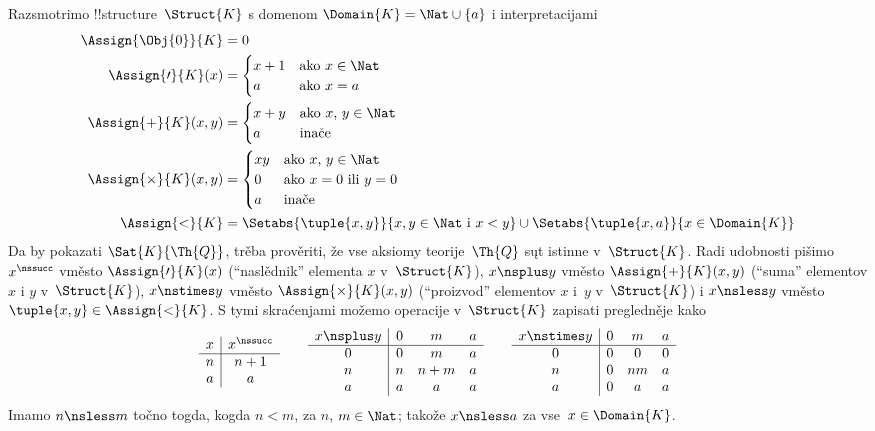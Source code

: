 \documentclass[../../../include/open-logic-section]{subfiles}
\begin{document}
\begin{ex}
Razsmotrimo !!{structure}~$\Struct{K}$ s domenom $\Domain{K} = \Nat
\cup \{a\}$ i interpretacijami
\begin{align*}
  \Assign{\Obj{0}}{K} & = 0\\
  \Assign{\prime}{K}(x) & =
  \begin{cases}
    x+1 & \text{ako $x\in \Nat$}\\
    a & \text{ako $x = a$}
  \end{cases}\\
  \Assign{+}{K}(x, y) & =
  \begin{cases}
    x+y & \text{ako $x$, $y \in\Nat$}\\
    a & \text{inače}
  \end{cases}\\
  \Assign{\times}{K}(x, y) & =
  \begin{cases}
    xy & \text{ako $x$, $y \in\Nat$}\\
    0 & \text{ako $x = 0$ ili $y = 0$}\\
    a & \text{inače}\\
  \end{cases}\\
  \Assign{<}{K} & =
  \Setabs{\tuple{x,y}}{x, y \in \Nat \text{ i } x<y} \cup
  \Setabs{\tuple{x,a}}{x \in \Domain{K}}
\end{align*}
Da by pokazati $\Sat{K}{\Th{Q}}$, trěba prověriti, že vse aksiomy
teorije~$\Th{Q}$ sųt istinne v~$\Struct{K}$. Radi udobnosti pišimo
$x^\nssucc$ vměsto $\Assign{\prime}{K}(x)$ (``naslědnik'' elementa $x$
v~$\Struct{K}$), $x \nsplus y$ vměsto $\Assign{+}{K}(x, y)$ (``suma''
elementov $x$ i $y$ v~$\Struct{K}$), $x \nstimes y$ vměsto
$\Assign{\times}{K}(x, y)$ (``proizvod'' elementov $x$ i~$y$
v~$\Struct{K}$) i $x \nsless y$ vměsto $\tuple{x,y} \in
\Assign{<}{K}$. S tymi skraćenjami možemo operacije
v~$\Struct{K}$ zapisati pregledněje kako
\[
\begin{array}{c|c}
  x & x^\nssucc \\
  \hline
  n & n+1 \\
  a & a
\end{array}
\qquad
\begin{array}{c|ccc}
  x \nsplus y & 0 & m & a \\
  \hline
  0 & 0 & m & a \\
  n & n & n+m & a \\
  a & a & a & a \\
\end{array}
\qquad
\begin{array}{c|ccc}
  x \nstimes y & 0 & m & a \\
  \hline
  0 & 0 & 0 & 0 \\
  n & 0 & nm & a \\
  a & 0 & a & a \\
\end{array}
\]
Imamo $n \nsless m$ točno togda, kogda $n<m$, za $n$, $m \in \Nat$;
takože $x \nsless a$ za vse~$x \in \Domain{K}$.


\end{ex}
\end{document}

